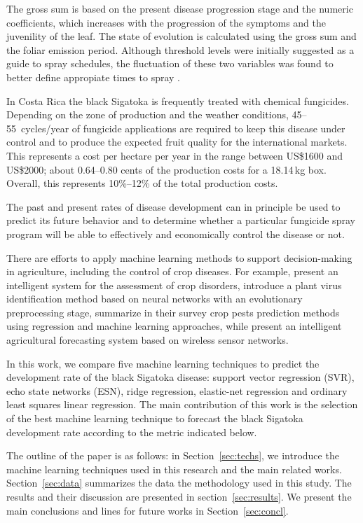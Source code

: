 \documentclass[review,authoryear,english]{elsarticle}
\begin{document}
The gross sum is based on the present disease progression stage and
the numeric coefficients, which increases with the progression of
the symptoms and the juvenility of the leaf.
%
The state of evolution is calculated using the gross sum and the
foliar emission period.
%
Although threshold levels were initially suggested as a guide to spray
schedules, the fluctuation of these two variables
was found to better define appropiate times to spray
\citep{Marinetal2003}.

In Costa Rica the black Sigatoka is frequently treated with
chemical fungicides.
%
Depending on the zone of production and the weather conditions,
45--55~cycles/year of fungicide applications are required to keep this
disease under control and to produce the expected fruit quality for the
international markets.
%
This represents a cost per hectare per year in the range between US\$1600 and
US\$2000; about 0.64--0.80 cents of the production costs for a
18.14\,kg box.
%
Overall, this represents 10\%--12\% of the total production costs.

The past and present rates of disease development can in principle be used
to predict its future behavior and to determine whether
a particular fungicide spray program will be able to effectively and
economically control the disease \citep{ChuangJeger1987} or not.

There are efforts to apply machine learning methods to support
decision-making in agriculture, including the control of crop
diseases. For example, \cite{Camargo2012} present an intelligent
system for the assessment of crop disorders, \cite{Huang2010}
introduce a plant virus identification method based on neural networks
with an evolutionary preprocessing stage, \cite{Kim2014} summarize in
their survey crop pests prediction methods using regression and
machine learning approaches, while \cite{Zhao2013} present an
intelligent agricultural forecasting system based on wireless sensor
networks.

In this work, we compare five machine learning techniques 
to predict the development rate of the black Sigatoka disease:
support
vector regression (SVR), echo state networks (ESN), ridge regression,
elastic-net regression and ordinary least squares linear regression.
%
The main contribution of this work is the selection of the best
machine learning technique to forecast the black Sigatoka development
rate according to the metric indicated below.

The outline of the paper is as follows: in Section~\ref{sec:techs}, we
introduce the machine learning techniques used in this research and
the main related works. Section~\ref{sec:data} summarizes the data the
methodology used in this study.  The results and their discussion are
presented in section~\ref{sec:results}.  We present the main
conclusions and lines for future works in Section~\ref{sec:concl}.
\end{document}
